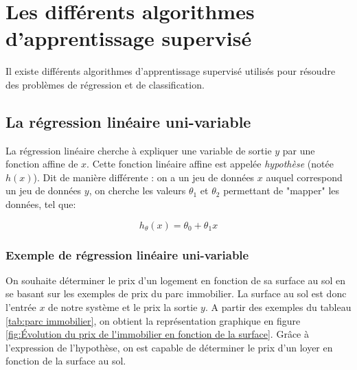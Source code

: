 \section{Les différents algorithmes d'apprentissage supervisé}
\label{Le Machine Learning:Les différents algorithmes d'apprentissage supervisé}
Il existe différents algorithmes d'apprentissage supervisé utilisés pour résoudre des problèmes de régression et de classification. 


\subsection{La régression linéaire uni-variable}
\label{Le Machine Learning:Les différents algorithmes d'apprentissage supervisé: La regression linéaire}
La régression linéaire cherche à expliquer une variable de sortie $y$ par une fonction affine de $x$. Cette fonction linéaire affine est appelée \emph{hypothèse} (notée $h(x)$). Dit de manière différente : on a un jeu de données $x$ auquel correspond un jeu de données $y$, on cherche les valeurs $\theta_1$ et $\theta_2$ permettant de "mapper" les données, tel que:

\begin{equation}
	h_\theta (x) = \theta_0 + \theta_1 x
\end{equation}


\subsubsection{Exemple de régression linéaire uni-variable}
\label{Le Machine Learning:Les différents algorithmes d'apprentissage supervisé: La regression linéaire: Exemple de régression linéaire uni-variable}
On souhaite déterminer le prix d'un logement en fonction de sa surface au sol en se basant sur les exemples de prix du parc immobilier. 
La surface au sol est donc l'entrée $x$ de notre système et le prix la sortie $y$. A partir des exemples du tableau \ref {tab:parc immobilier}, on obtient la représentation graphique en figure \ref{fig:Évolution du prix de l'immobilier en fonction de la surface}. Grâce à l'expression de l'hypothèse, on est capable de déterminer le prix d'un loyer en fonction de la surface au sol.  

